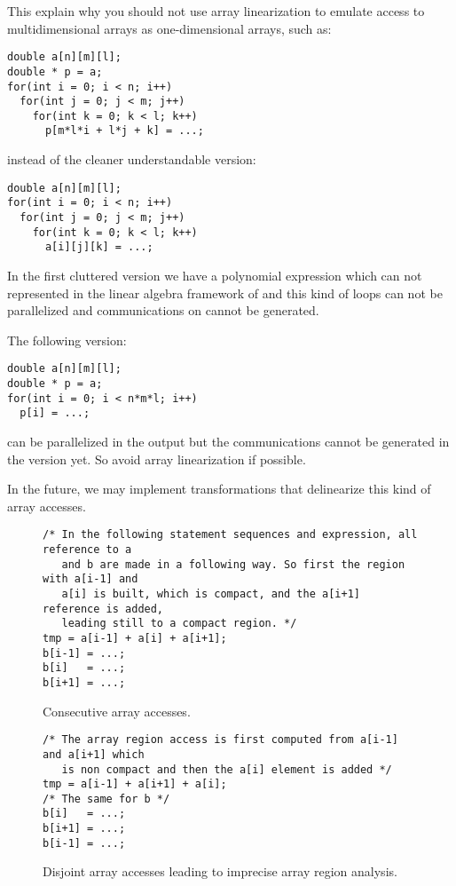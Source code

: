 \documentclass[a4paper]{article}
\begin{document}
This explain why you should not use array linearization to emulate
access to multidimensional arrays as one-dimensional arrays, such as:
\begin{lstlisting}
double a[n][m][l];
double * p = a;
for(int i = 0; i < n; i++)
  for(int j = 0; j < m; j++)
    for(int k = 0; k < l; k++)
      p[m*l*i + l*j + k] = ...;
\end{lstlisting}
instead of the cleaner understandable version:
\begin{lstlisting}
double a[n][m][l];
for(int i = 0; i < n; i++)
  for(int j = 0; j < m; j++)
    for(int k = 0; k < l; k++)
      a[i][j][k] = ...;
\end{lstlisting}
In the first cluttered version we have a polynomial expression which can
not represented in the linear algebra framework of \Apips and this kind of
loops can not be parallelized and communications on \Agpu cannot be
generated.

The following version:
\begin{lstlisting}
double a[n][m][l];
double * p = a;
for(int i = 0; i < n*m*l; i++)
  p[i] = ...;
\end{lstlisting}
can be parallelized in the \Aopenmp output but the communications cannot
be generated in the \Agpu version yet. So avoid array linearization if
possible.

In the future, we may implement transformations that delinearize this kind
of array accesses.

\begin{figure}
  \centering
  \begin{lstlisting}
/* In the following statement sequences and expression, all reference to a
   and b are made in a following way. So first the region with a[i-1] and
   a[i] is built, which is compact, and the a[i+1] reference is added,
   leading still to a compact region. */
tmp = a[i-1] + a[i] + a[i+1];
b[i-1] = ...;
b[i]   = ...;
b[i+1] = ...;
  \end{lstlisting}
  \caption{Consecutive array accesses.}
  \label{fig:consecutive_array_accesses}
\end{figure}

\begin{figure}
  \centering
  \begin{lstlisting}
/* The array region access is first computed from a[i-1] and a[i+1] which
   is non compact and then the a[i] element is added */
tmp = a[i-1] + a[i+1] + a[i];
/* The same for b */
b[i]   = ...;
b[i+1] = ...;
b[i-1] = ...;
  \end{lstlisting}
  \caption{Disjoint array accesses leading to imprecise array region
    analysis.}
  \label{fig:disjoint_array_accesses}
\end{figure}
\end{document}
